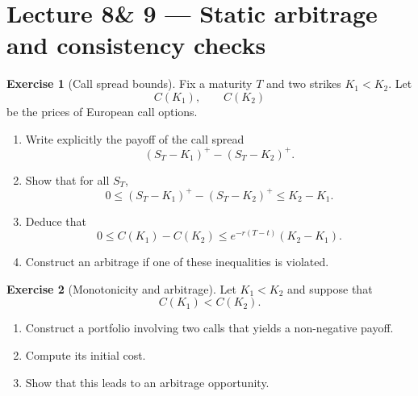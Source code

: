 \documentclass[11pt]{article}
\newcommand{\1}{\mathbf{1}}
\theoremstyle{definition}
\newtheorem{exercise}{Exercise}[section]
\begin{document}

\section{Lecture 8\& 9 --- Static arbitrage and consistency checks}

\begin{exercise}[Call spread bounds]
Fix a maturity \(T\) and two strikes \(K_1<K_2\). Let
\[
C(K_1), \qquad C(K_2)
\]
be the prices of European call options.

\begin{enumerate}[leftmargin=1.6em]
\item Write explicitly the payoff of the call spread
\[
(S_T-K_1)^+-(S_T-K_2)^+.
\]

\item Show that for all \(S_T\),
\[
0 \le (S_T-K_1)^+-(S_T-K_2)^+ \le K_2-K_1.
\]

\item Deduce that
\[
0 \le C(K_1)-C(K_2) \le e^{-r(T-t)}(K_2-K_1).
\]

\item Construct an arbitrage if one of these inequalities is violated.
\end{enumerate}
\end{exercise}


\begin{exercise}[Monotonicity and arbitrage]
Let \(K_1<K_2\) and suppose that
\[
C(K_1) < C(K_2).
\]

\begin{enumerate}[leftmargin=1.6em]
\item Construct a portfolio involving two calls that yields a non-negative payoff.

\item Compute its initial cost.

\item Show that this leads to an arbitrage opportunity.
\end{enumerate}
\end{exercise}

\end{document}
